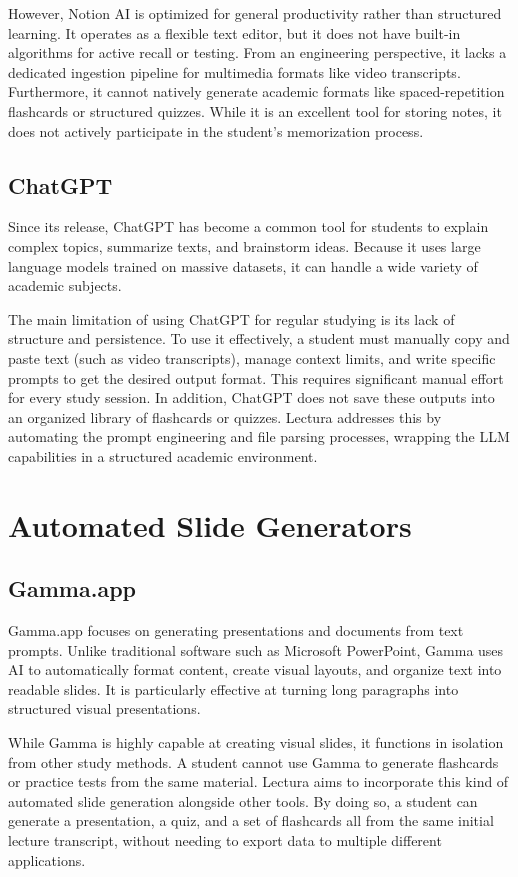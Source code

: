 However, Notion AI is optimized for general productivity rather than structured learning. It operates as a flexible text editor, but it does not have built-in algorithms for active recall or testing. From an engineering perspective, it lacks a dedicated ingestion pipeline for multimedia formats like video transcripts. Furthermore, it cannot natively generate academic formats like spaced-repetition flashcards or structured quizzes. While it is an excellent tool for storing notes, it does not actively participate in the student's memorization process.

\subsection{ChatGPT}
Since its release, ChatGPT has become a common tool for students to explain complex topics, summarize texts, and brainstorm ideas. Because it uses large language models trained on massive datasets, it can handle a wide variety of academic subjects.

The main limitation of using ChatGPT for regular studying is its lack of structure and persistence. To use it effectively, a student must manually copy and paste text (such as video transcripts), manage context limits, and write specific prompts to get the desired output format. This requires significant manual effort for every study session. In addition, ChatGPT does not save these outputs into an organized library of flashcards or quizzes. Lectura addresses this by automating the prompt engineering and file parsing processes, wrapping the LLM capabilities in a structured academic environment.

\section{Automated Slide Generators}

\subsection{Gamma.app}
Gamma.app focuses on generating presentations and documents from text prompts. Unlike traditional software such as Microsoft PowerPoint, Gamma uses AI to automatically format content, create visual layouts, and organize text into readable slides. It is particularly effective at turning long paragraphs into structured visual presentations.

While Gamma is highly capable at creating visual slides, it functions in isolation from other study methods. A student cannot use Gamma to generate flashcards or practice tests from the same material. Lectura aims to incorporate this kind of automated slide generation alongside other tools. By doing so, a student can generate a presentation, a quiz, and a set of flashcards all from the same initial lecture transcript, without needing to export data to multiple different applications.

